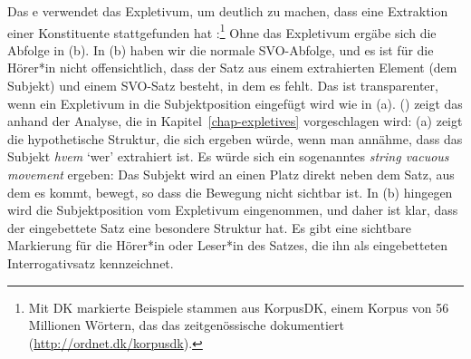 \noindent
Das e verwendet das Expletivum, um deutlich zu machen, dass eine Extraktion einer Konstituente stattgefunden hat
\citep[]{MOe2011a}:\footnote{
  Mit DK markierte Beispiele stammen aus KorpusDK, einem Korpus von 56 Millionen Wörtern, das das
  zeitgenössische  dokumentiert (\url{http://ordnet.dk/korpusdk}).
}
\eal
{}
\zl
Ohne das Expletivum ergäbe sich die Abfolge in (b). In (b) haben wir die
normale SVO-Abfolge, und es ist für die Hörer*in nicht offensichtlich, dass der Satz aus einem extrahierten
Element (dem Subjekt) und einem SVO-Satz besteht, in dem es fehlt. Das ist transparenter, wenn ein
Expletivum in die Subjektposition eingefügt wird wie in (a). () zeigt das anhand der
Analyse, die in Kapitel~\ref{chap-expletives} vorgeschlagen wird: (a) zeigt die hypothetische
Struktur, die sich ergeben würde, wenn man annähme, dass das Subjekt \emph{hvem} `wer'
extrahiert ist. Es würde sich ein sogenanntes \emph{string vacuous movement} ergeben: Das Subjekt wird an einen Platz
direkt neben dem Satz, aus dem es kommt, bewegt, so dass die Bewegung nicht sichtbar ist. In (b) hingegen wird die Subjektposition vom Expletivum eingenommen, und
daher ist klar, dass der eingebettete Satz eine besondere Struktur hat. Es gibt eine sichtbare Markierung für
die Hörer*in oder Leser*in des Satzes, die ihn als eingebetteten Interrogativsatz kennzeichnet.
\eal
{}
\zl

